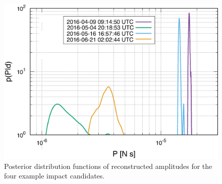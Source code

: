 \documentclass[a4paper]{jpconf}
\begin{document}
\begin{figure}[h!]
	\centering
	\includegraphics[width=12 cm]{figures/amplitudes.eps}
	\caption{\label{fig:amps}Posterior distribution functions of reconstructed amplitudes for the four example impact candidates.}
\end{figure}
\end{document}
